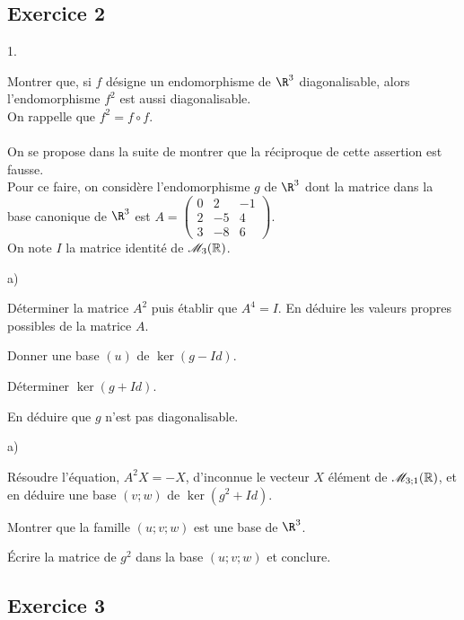 \documentclass[11pt]{article}%
\begin{document}
\subsection*{Exercice 2}
\begin{noliste}{1.}
 \setlength{\itemsep}{4mm}
\item Montrer que, si $f$ désigne un endomorphisme de $\R^{3}$
diagonalisable, alors l'endomorphisme $f^{2}$ est aussi diagonalisable.
\\
On rappelle que $f^{2} = f\circ f$.
\\
\\
On se propose dans la suite de montrer que la réciproque de cette
assertion est fausse. \\
Pour ce faire, on considère l'endomorphisme $g$ de $\R^{3}$
dont la matrice dans la base canonique de $\R^{3}$ est $A = \left(
\begin{array}{crr}
0 & 2 & -1\\
2 & -5 & 4\\
3 & -8 & 6
\end{array}
\right)$.\\
 On note $I$ la matrice identité de $\mathscr{M}_{3}(\mathbb{R})$. 
\item {}

\begin{noliste}{a)}
 \setlength{\itemsep}{2mm}
\item Déterminer la matrice $A^{2}$ puis établir que $A^{4} = I$. En
déduire
les valeurs propres possibles de la matrice $A$.
\item Donner une base $(u)$ de $\ker(g-Id)$.
\item Déterminer $\ker(g + Id)$.
\item En déduire que $g$ n'est pas diagonalisable. 
\end{noliste}
\item {}

\begin{noliste}{a)}
 \setlength{\itemsep}{2mm}
\item Résoudre l'équation, $A^{2}X = -X$, d'inconnue le vecteur $X$
élément
de $\mathscr{M}_{3;1}(\mathbb{R})$, et en déduire une
base $(v;w)$ de $\ker(g^{2} + Id)$. 
\item Montrer que la famille $(u;v;w)$ est une base de $\R^{3}$. 
\item Écrire la matrice de $g^{2}$ dans la base $(u;v;w)$ et conclure. 
\end{noliste}
\end{noliste}

\subsection*{Exercice 3 }
\end{document}
